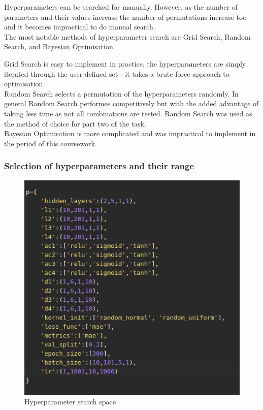 \documentclass{article}
\begin{document}
Hyperparameters can be searched for manually. However, as the number of parameters and their values increase the number of permutations increase too and it becomes impractical to do manual search. 
\\
The most notable methods of hyperparameter search are Grid Search, Random Search, and Bayesian Optimisation. 

Grid Search is easy to implement in practice, the hyperparameters are simply iterated through the user-defined set - it takes a brute force approach to optimisation.
\\
Random Search selects a permutation of the hyperparameters randomly. In general Random Search performes competitively but with the added advantage of taking less time as not all combinations are tested. Random Search was used as the method of choice for part two of the task.
\\
Bayesian Optimisation is more complicated and was impractical to implement in the period of this coursework.

\subsubsection{Selection of hyperparameters and their range}

\begin{figure}[h]
    \centering
    \includegraphics[scale=0.5]{figure/param.png}
    \caption{Hyperparameter search space}
    \label{fig:param_space}
\end{figure}
\end{document}
